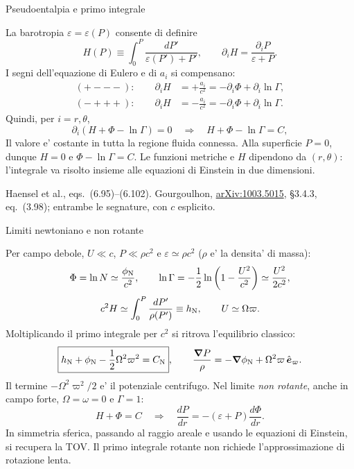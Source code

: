\begin{frame}[t]{Pseudoentalpia e primo integrale}
\small\raggedright
La barotropia $\varepsilon=\varepsilon(P)$ consente di definire
\[
H(P)\equiv\int_0^P\frac{dP'}{\varepsilon(P')+P'},
\qquad
\partial_iH=\frac{\partial_iP}{\varepsilon+P}.
\]
I segni dell'equazione di Eulero e di $a_i$ si compensano:
\[
\begin{aligned}
(+---):\qquad\partial_iH&=+\frac{a_i}{c^2}
=-\partial_i\Phi+\partial_i\ln\Gamma,\\[.5ex]
(-+++):\qquad\partial_iH&=-\frac{a_i}{c^2}
=-\partial_i\Phi+\partial_i\ln\Gamma.
\end{aligned}
\]
Quindi, per $i=r,\theta$,
\[
\partial_i(H+\Phi-\ln\Gamma)=0
\quad\Longrightarrow\quad
\boxed{H+\Phi-\ln\Gamma=C},
\]
Il valore e' costante in tutta la regione fluida connessa.
Alla superficie $P=0$, dunque $H=0$ e $\Phi-\ln\Gamma=C$.
Le funzioni metriche e $H$ dipendono da $(r,\theta)$: l'integrale va risolto
insieme alle equazioni di Einstein in due dimensioni.
\par\smallskip
\footnotesize Haensel et al., eqs.~(6.95)--(6.102).
Gourgoulhon, \href{https://arxiv.org/abs/1003.5015}{arXiv:1003.5015}, \S3.4.3,
eq.~(3.98); entrambe le segnature, con $c$ esplicito.
\end{frame}


\begin{frame}[t]{Limiti newtoniano e non rotante}
\small\raggedright
Per campo debole, $U\ll c$, $P\ll\rho c^2$ e $\varepsilon\simeq\rho c^2$
($\rho$ e' la densita' di massa):
\[
\Phi=\ln N\simeq\frac{\phi_{\rm N}}{c^2},\qquad
\ln\Gamma=-\frac12\ln\left(1-\frac{U^2}{c^2}\right)
\simeq\frac{U^2}{2c^2},
\]
\[
c^2H\simeq\int_0^P\frac{dP'}{\rho(P')}\equiv h_{\rm N},
\qquad U\simeq\Omega\varpi.
\]
Moltiplicando il primo integrale per $c^2$ si ritrova l'equilibrio classico:
\[
\boxed{h_{\rm N}+\phi_{\rm N}-\frac12\Omega^2\varpi^2=C_{\rm N}},
\qquad
\frac{\boldsymbol\nabla P}{\rho}
=-\boldsymbol\nabla\phi_{\rm N}
+\Omega^2\varpi\,\hat{\boldsymbol e}_{\varpi}.
\]
Il termine $-\Omega^2\varpi^2/2$ e' il potenziale centrifugo.
Nel limite \emph{non rotante}, anche in campo forte, $\Omega=\omega=0$ e $\Gamma=1$:
\[
H+\Phi=C
\quad\Longrightarrow\quad
\frac{dP}{dr}=-(\varepsilon+P)\frac{d\Phi}{dr}.
\]
In simmetria sferica, passando al raggio areale e usando le equazioni di Einstein,
si recupera la TOV.
Il primo integrale rotante non richiede l'approssimazione di rotazione lenta.
\end{frame}




